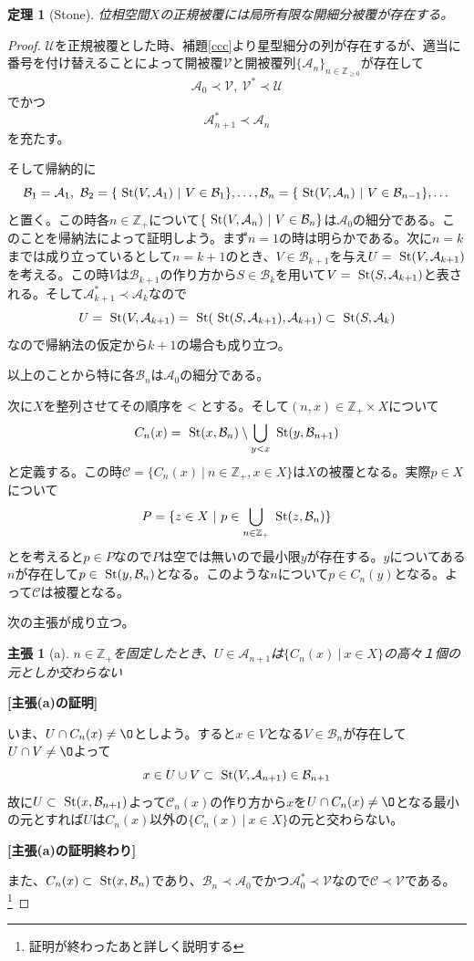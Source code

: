 \documentclass[leqno]{jsarticle}
\newtheorem{thm}{定理}
\newtheorem*{claim}{主張}
\newcommand{\zz}{\mathbb{Z}}
\newcommand{\uu}{\mathcal{U}}
\newcommand{\vv}{\mathcal{V}}
\newcommand{\A}{\mathcal{A}}
\newcommand{\B}{\mathcal{B}}
\newcommand{\s}{\text{  {\rm St}} }
\newcommand{\C}{\mathcal{C}}
\newcommand{\pr}{\prec}
\newcommand{\zp}{\zz_{+}}
\newcommand{\zr}{\zz_{\ge0}}
\begin{document}
\setcounter{equation}{0}
\begin{thm}[Stone]\label{stone}
位相空間$X$の正規被覆には局所有限な開細分被覆が存在する。
\end{thm}
\begin{proof}
$\uu$を正規被覆とした時、補題\ref{ccc}より星型細分の列が存在するが、適当に番号を付け替えることによって開被覆$\vv$と開被覆列$\{\A_n\}_{n\in \zr}$が存在して
\[
\A_0\pr \vv,\ \vv^{*}\pr\uu
\]
でかつ
\[
\A_{n+1}^{*}\pr\A_n
\]
を充たす。\par
そして帰納的に
\[
\B_1=\A_1,\ \B_2=\{\s(V,\A_1)\ |\ V\in \B_1\},\dots,\B_n=\{\s(V,\A_n)\ |\ V\in \B_{n-1}\},\dots
\]
と置く。この時各$n\in \zp$について$\{\s(V,\A_n)\ |\ V\in\B_n\}$は$\A_0$の細分である。このことを帰納法によって証明しよう。まず$n=1$の時は明らかである。次に$n=k$までは成り立っているとして$n=k+1$のとき、$V\in \B_{k+1}$を与え$U=\s(V,\A_{k+1})$を考える。この時$V$は$\B_{k+1}$の作り方から$S\in \B_k$を用いて$V=\s(S,\A_{k+1})$と表される。そして$\A_{k+1}^{*}\pr \A_k$なので
\[
U=\s(V,\A_{k+1})=\s(\s(S,\A_{k+1}),\A_{k+1})\subset \s(S,\A_k)
\]
なので帰納法の仮定から$k+1$の場合も成り立つ。\par
以上のことから特に各$\B_n$は$\A_0$の細分である。\par
次に$X$を整列させてその順序を$<$とする。そして$(n,x)\in \zp\times X$について
\[
C_n(x)=\s(x,\B_n)\setminus \bigcup_{y<x}\s(y,\B_{n+1})
\]
と定義する。この時$\C=\{C_n(x)\ |\ n\in \zp,x\in X\}$は$X$の被覆となる。実際$p\in X$について
\[
P=\{z\in X\ |\ p\in \bigcup_{n\in \zp}\s(z,\B_n)\}
\]
とを考えると$p\in P$なので$P$は空では無いので最小限$y$が存在する。$y$についてある$n$が存在して$p\in \s(y,\B_n)$となる。このような$n$について$p\in C_n(y)$となる。よって$\C$は被覆となる。\par
次の主張が成り立つ。
\begin{claim}[a]
$n\in \zp$を固定したとき、$U\in \A_{n+1}$は$\{C_n(x)\ |\ x\in X\}$の高々１個の元としか交わらない
\end{claim}
{\bf [主張(a)の証明]}\par
いま、$U\cap C_n(x)\neq\O$としよう。すると$x\in V$となる$V\in \B_n$が存在して$U\cap V\neq\O$よって
\[
x\in U\cup V\subset \s(V,\A_{n+1})\in \B_{n+1}
\]
故に$U\subset \s(x,\B_{n+1})$よって$\C_n(x)$の作り方から$x$を$U\cap C_n(x)\neq\O$となる最小の元とすれば$U$は$C_n(x)$以外の$\{C_n(x)\ |\ x\in X\}$の元と交わらない。\par
{\bf [主張(a)の証明終わり]}\par
また、$C_n(x)\subset \s(x,\B_{n})$であり、$\B_n\pr \A_0$でかつ$\A_0^{*}\pr \vv$なので$\C\pr\vv$である。\footnote{証明が終わったあと詳しく説明する}\par

\end{proof}
\end{document}
